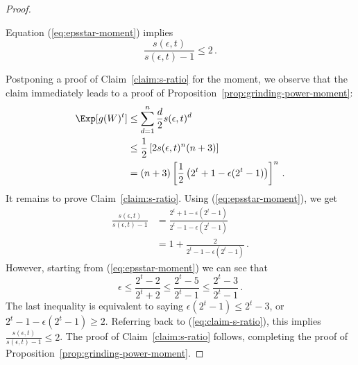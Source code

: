 \begin{proof}
\begin{claim}\label{claim:s-ratio}
Equation (\ref{eq:epsstar-moment}) implies
\[
\frac{s(\epsilon, t)}{s(\epsilon, t) - 1 } \leq 2\, .
\]
\end{claim}
Postponing a proof of Claim~\ref{claim:s-ratio} for the moment, we observe that the claim immediately leads to a proof of Proposition~\ref{prop:grinding-power-moment}:
\begin{align*}
\Exp[ g(W)^t ] 
&\leq \sum_{d=1}^n{\frac{d}{2} s(\epsilon, t)^d}\\
&\leq \frac{1}{2} \left[2 s(\epsilon,t)^n ( n + 3) \right] \\
&= (n+3)\left[\frac{1}{2}\left( 2^t + 1 - \epsilon (2^t -1) \right)\right]^n\, .
\end{align*}
It remains to prove Claim~\ref{claim:s-ratio}. Using (\ref{eq:epsstar-moment}), we get
\begin{align}
\frac{s(\epsilon, t)}{s(\epsilon, t)-1}
&= \frac{2^t + 1 - \epsilon(2^t - 1)}{2^t - 1 - \epsilon(2^t - 1)} \nonumber \\
&= 1 + \frac{2}{2^t - 1 - \epsilon(2^t - 1)} \label{eq:claim-s-ratio}
\, .
\end{align}
However, starting from (\ref{eq:epsstar-moment}) we can see that
\[
\epsilon 
\leq 
\frac{2^t - 2}{2^t +2} 
\leq 
\frac{2^t - 5}{2^t - 1}
\leq
\frac{2^t - 3}{2^t - 1}\, .
\]
The last inequality is equivalent to saying $\epsilon(2^t - 1) \leq 2^t - 3$, or $2^t - 1 -\epsilon(2^t - 1) \geq 2$. Referring back to (\ref{eq:claim-s-ratio}), this implies $\displaystyle \frac{s(\epsilon, t)}{s(\epsilon, t)-1} \leq 2$. The proof of Claim~\ref{claim:s-ratio} follows, completing the proof of Proposition~\ref{prop:grinding-power-moment}.
\end{proof}


